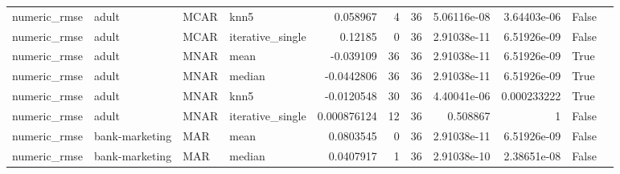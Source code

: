 \begin{table}[ht]
\begin{tabular}{llllrrrrrll}
 numeric\_rmse           & adult                & MCAR        & knn5             &      0.058967    &                   4 &      36 & 5.06116e-08 & 3.64403e-06 & False              &                                                                                                                    \\
 numeric\_rmse           & adult                & MCAR        & iterative\_single &      0.12185     &                   0 &      36 & 2.91038e-11 & 6.51926e-09 & False              &                                                                                                                    \\
 numeric\_rmse           & adult                & MNAR        & mean             &     -0.039109    &                  36 &      36 & 2.91038e-11 & 6.51926e-09 & True               &                                                                                                                    \\
 numeric\_rmse           & adult                & MNAR        & median           &     -0.0442806   &                  36 &      36 & 2.91038e-11 & 6.51926e-09 & True               &                                                                                                                    \\
 numeric\_rmse           & adult                & MNAR        & knn5             &     -0.0120548   &                  30 &      36 & 4.40041e-06 & 0.000233222 & True               &                                                                                                                    \\
 numeric\_rmse           & adult                & MNAR        & iterative\_single &      0.000876124 &                  12 &      36 & 0.508867    & 1           & False              &                                                                                                                    \\
 numeric\_rmse           & bank-marketing       & MAR         & mean             &      0.0803545   &                   0 &      36 & 2.91038e-11 & 6.51926e-09 & False              &                                                                                                                    \\
 numeric\_rmse           & bank-marketing       & MAR         & median           &      0.0407917   &                   1 &      36 & 2.91038e-10 & 2.38651e-08 & False              &                                                                                                                    \\

\end{tabular}
\end{table}
